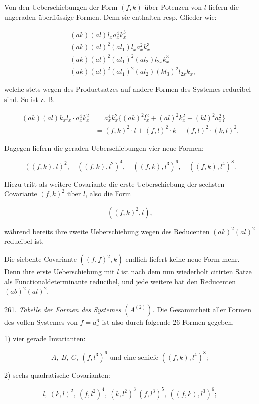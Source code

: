 Von den Ueberschiebungen der Form $(f, k)$ über Potenzen von $l$
liefern die ungeraden überflüssige Formen. Denn sie enthalten resp.
Glieder wie:

\[
\begin{aligned}
&(ak) (al) l_x a_x^4 k_x^3\\
&(ak) (al)^2 (al_1) l_x a_x^2 k_x^3\\
&(ak) (al)^2 (al_1)^2 (al_2) l_{2x} k_x^3\\
&(ak) (al)^2 (al_1)^2 (al_2) (kl_3)^2 l_{2x} k_x,
\end{aligned}
\]


welche stets wegen des Productsatzes auf andere Formen des Systemes
reducibel sind. So ist z. B.

\[
\begin{aligned}
(ak) (al) k_x l_x \cdot a_x^4 k_x^2 &= a_x^4 k_x^2 \{(ak)^2 l_x^2 + (al)^2 k_x^2 - (kl)^2 a_x^2\}\\
&= (f, k)^2 \cdot l + (f, l)^2 \cdot k - (f, l)^2 \cdot (k, l)^2.
\end{aligned}
\]

Dagegen liefern die geraden Ueberschiebungen vier neue Formen:

\[
((f, k), l)^2, \quad ((f, k), l^2)^4, \quad ((f, k), l^3)^6, \quad ((f, k), l^4)^8.
\]

Hiezu tritt als weitere Covariante die erste Ueberschiebung der sechsten
Covariante $(f, k)^2$ über $l$, also die Form

\[
((f, k)^2, l),
\]

während bereits ihre zweite Ueberschiebung wegen des Reducenten
$(ak)^2 (al)^2$ reducibel ist.

Die siebente Covariante $((f, f)^2, k)$ endlich liefert keine neue Form
mehr. Denn ihre erste Ueberschiebung mit $l$ ist nach dem nun wiederholt
 citirten Satze als Functionaldeterminante reducibel, und jede
weitere hat den Reducenten $(ab)^2 (al)^2$.

261. \textit{Tabelle der Formen des Systemes $(A^{(2)})$.} Die Gesammtheit
aller Formen des vollen Systemes von $f = a_x^6$ ist also durch folgende
26 Formen gegeben.

1) vier gerade Invarianten:

\[
A, \ B, \ C, \ (f, l^3)^6 \text{ und eine schiefe } ((f, k), l^4)^8;
\]

2) sechs quadratische Covarianten:

\[
l, \ (k, l)^2, \ (f, l^2)^4, \ (k, l^2)^3 \ (f, l^3)^5, \ ((f, k), l^3)^6;
\]

